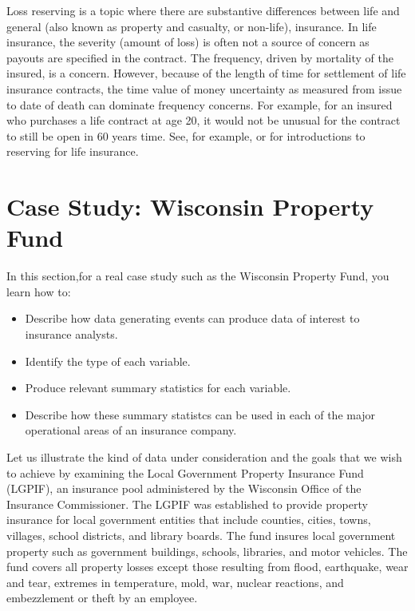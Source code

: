 \documentclass[]{book}
\providecommand{\tightlist}{%
  \setlength{\itemsep}{0pt}\setlength{\parskip}{0pt}}
\theoremstyle{definition}
\theoremstyle{definition}
\theoremstyle{definition}
\theoremstyle{remark}
\begin{document}
Loss reserving is a topic where there are substantive differences
between life and general (also known as property and casualty, or
non-life), insurance. In life insurance, the severity (amount of loss)
is often not a source of concern as payouts are specified in the
contract. The frequency, driven by mortality of the insured, is a
concern. However, because of the length of time for settlement of life
insurance contracts, the time value of money uncertainty as measured
from issue to date of death can dominate frequency concerns. For
example, for an insured who purchases a life contract at age 20, it
would not be unusual for the contract to still be open in 60 years time.
See, for example, \citep{bowers1986actuarial} or
\citep{dickson2013actuarial} for introductions to reserving for life
insurance.

\section{Case Study: Wisconsin Property Fund}\label{S:LGPIF}

In this section,for a real case study such as the Wisconsin Property
Fund, you learn how to:

\begin{itemize}
\tightlist
\item
  Describe how data generating events can produce data of interest to
  insurance analysts.
\item
  Identify the type of each variable.
\item
  Produce relevant summary statistics for each variable.
\item
  Describe how these summary statistcs can be used in each of the major
  operational areas of an insurance company.
\end{itemize}

Let us illustrate the kind of data under consideration and the goals
that we wish to achieve by examining the Local Government Property
Insurance Fund (LGPIF), an insurance pool administered by the Wisconsin
Office of the Insurance Commissioner. The LGPIF was established to
provide property insurance for local government entities that include
counties, cities, towns, villages, school districts, and library boards.
The fund insures local government property such as government buildings,
schools, libraries, and motor vehicles. The fund covers all property
losses except those resulting from flood, earthquake, wear and tear,
extremes in temperature, mold, war, nuclear reactions, and embezzlement
or theft by an employee.
\end{document}
